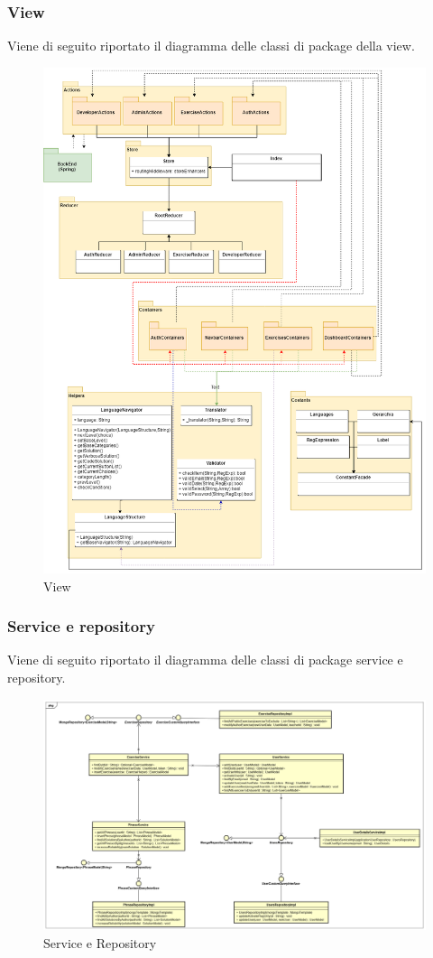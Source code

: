\subsubsection{View}
Viene di seguito riportato il diagramma delle classi di package della view.
\begin{figure}[H]
\centering
\includegraphics[width=17cm, keepaspectratio]{img/view.png} 
\caption{View}
\end{figure}
\newpage
\subsubsection{Service e repository}
Viene di seguito riportato il diagramma delle classi di package service e repository.
\begin{figure}[H]
\centering
\includegraphics[width=17cm, keepaspectratio]{img/Service-repository.png} 
\caption{Service e Repository}
\end{figure}

